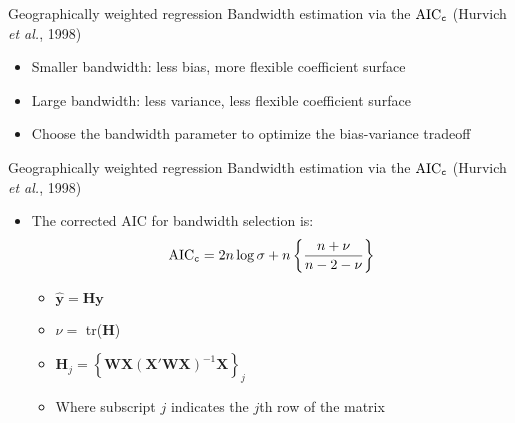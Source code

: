 \documentclass[12pt,t]{beamer}
\newcommand{\subt}[1]{{\footnotesize \color{subtitle} {#1}}}
\begin{document}
\begin{frame}{Geographically weighted regression}
\subt{Bandwidth estimation via the $\text{AIC}_{\tt c}$ (Hurvich \emph{et al.}, 1998)}

\bigskip
\begin{itemize}
    \item Smaller bandwidth: less bias, more flexible coefficient surface
    \item Large bandwidth: less variance, less flexible coefficient surface
    \item Choose the bandwidth parameter to optimize the bias-variance tradeoff
\end{itemize}

\end{frame}





\begin{frame}{Geographically weighted regression}
\subt{Bandwidth estimation via the $\text{AIC}_{\tt c}$ (Hurvich \emph{et al.}, 1998)}

\bigskip
\begin{itemize}
    \item The corrected AIC for bandwidth selection is:
    \begin{align*}
      \text{AIC}_{\tt c} = 2 n \log{\sigma} + n \left\{\frac{n + \nu}{n - 2 - \nu}\right\}
    \end{align*}
    \begin{itemize}
        \item $\hat{\bm{y}} = \bm{H}\bm{y}$
        \item $\nu = $ tr($\bm{H}$)
        \item $\bm{H}_j = \left\{\bm{W}\bm{X}(\bm{X}'\bm{W}\bm{X})^{-1}\bm{X}\right\}_j$
        \item Where subscript $j$ indicates the $j$th row of the matrix
    \end{itemize}
\end{itemize}

\end{frame}
\end{document}

